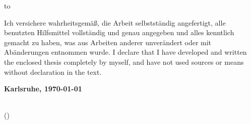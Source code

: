 \vspace*{36\baselineskip}
\hbox to \textwidth{\hrulefill}
\par
{}
  {Ich versichere wahrheitsgem\"a\ss, die Arbeit selbstst\"andig angefertigt, alle benutzten Hilfsmittel vollst\"andig und genau angegeben und alles kenntlich gemacht zu haben, was aus Arbeiten anderer unver\"andert oder mit Ab\"anderungen entnommen wurde.}
  {I declare that I have developed and written the enclosed thesis completely by myself, and have not used sources or means without declaration in the text.}

\textbf{Karlsruhe, \today}
\vspace{1.5cm}

\dotfill\hspace*{8.0cm}\\
\hspace*{2cm}(\textbf{\theauthor}) %

\thispagestyle{empty}
\pagebreak